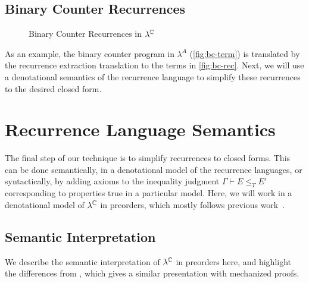 \subsection{Binary Counter Recurrences}

\begin{figure}
  
  \vspace{-0.25in}
  \caption{Binary Counter Recurrences in $\lambda^{\mathbb{C}}$}
  \label{fig:bc-rec}
\end{figure}

As an example, the binary counter program in $\lambda^A$
(\autoref{fig:bc-term}) is translated by the recurrence extraction
translation to the terms in \autoref{fig:bc-rec}.
Next, we will use a denotational semantics of the recurrence language to
simplify these recurrences to the desired closed form.

\section{Recurrence Language Semantics} \label{sec:preorder}

The final step of our technique is to simplify recurrences to closed
forms.  This can be done semantically, in a denotational model of the
recurrence languages, or syntactically, by adding axioms to the
inequality judgment $\Gamma \vdash E \le_T E'$ corresponding to
properties true in a particular model.  Here, we will work in a
denotational model of $\lambda^{\mathbb{C}}$ in preorders, which mostly follows
previous work~\cite{danner-et-al:plpv13,danner-et-al:icfp15,hudson}.

\subsection{Semantic Interpretation}

We describe the semantic interpretation of $\lambda^{\mathbb{C}}$ in preorders
here, and highlight the differences from \cite{hudson}, which gives a
similar presentation with mechanized proofs.

